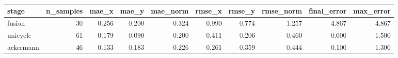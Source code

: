 \begin{tabular}{lrrrrrrrrr}
\hline
stage & n\_samples & mae\_x & mae\_y & mae\_norm & rmse\_x & rmse\_y & rmse\_norm & final\_error & max\_error \\
\hline
fusion & 30 & 0.256 & 0.200 & 0.324 & 0.990 & 0.774 & 1.257 & 4.867 & 4.867 \\
unicycle & 61 & 0.179 & 0.090 & 0.200 & 0.411 & 0.206 & 0.460 & 0.000 & 1.500 \\
ackermann & 46 & 0.133 & 0.183 & 0.226 & 0.261 & 0.359 & 0.444 & 0.100 & 1.300 \\
\hline
\end{tabular}